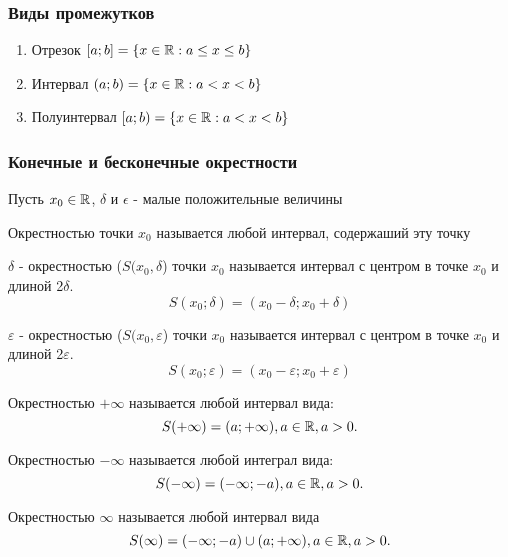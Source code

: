 \subsubsection{Виды промежутков}
\begin{enumerate}
  \item Отрезок $[a;b] = \{x\in \mathbb{R} : a \le x \le b\} $ \\
  \item Интервал $(a; b) = \{x\in \mathbb{R} : a < x < b\} $\\
  \item Полуинтервал $[a; b) = \{x\in \mathbb{R}: a < x < b\} $ \\ 
\end{enumerate}

\subsubsection{Конечные и бесконечные окрестности}

Пусть $x_0\in \mathbb{R}$, $\delta$ и $\epsilon$ - малые положительные величины

\begin{definition}
  Окрестностью точки $x_0$ называется любой интервал, содержаший эту точку
\end{definition}

\begin{definition}
  $\delta$ - окрестностью ($S(x_0, \delta$) точки $x_0$ называется интервал с центром в точке $x_0$ и длиной 2$\delta$.
  \[
  S(x_0; \delta) = (x_0 - \delta; x_0 + \delta)
  \] 
\end{definition}

\begin{definition}
  $\varepsilon$ - окрестностью ($S(x_0, \varepsilon$) точки $x_0$ называется интервал с центром в точке $x_0$ и длиной 2$\varepsilon$.
  \[
  S(x_0; \varepsilon) = (x_0 - \varepsilon; x_0 + \varepsilon)
  \] 
\end{definition}

\begin{definition}
  Окрестностью $+\infty$ называется любой интервал вида:
  \[
  S(+\infty) = (a; +\infty), a\in \mathbb{R}, a > 0
  .\] 
\end{definition}

\begin{definition}
  Окрестностью $-\infty$ называется любой интеграл вида:
  \[
  S(-\infty) = (-\infty; -a), a\in \mathbb{R}, a > 0
  .\] 
\end{definition}

\begin{definition}
  Окрестностью $\infty$ называется любой интервал вида
  \[
  S(\infty) = (-\infty; -a) \cup (a; +\infty), a\in \mathbb{R}, a > 0
  .\] 
\end{definition}

